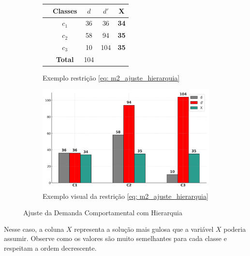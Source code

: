 \begin{figure}[H]
	\centering
	\begin{subfigure}[b]{0.45\linewidth}
		\centering
		\begin{tabular}{lcccc}
			\toprule
			\textbf{} & \textbf{Classes} & \textbf{$d$} & \textbf{$d'$} & \textbf{X} \\
			\midrule
			& $c_1$ & 36  & 36  & \textbf{34} \\
			& $c_2$ & 58  & 94  & \textbf{35} \\
			& $c_3$ & 10  & 104 & \textbf{35} \\
			\midrule
			& \textbf{Total} & 104 & & \\
			\bottomrule
		\end{tabular}
		\caption{Exemplo restrição  \ref{eq: m2_ajuste_hierarquia}}
		\label{tab:exe_ajuste_dem_hierarquia}
	\end{subfigure}\hspace{5mm}
	\begin{subfigure}[b]{0.45\linewidth}
		\centering
		\includegraphics[width=\linewidth]{img/dem_hierar.png}
		\caption{Exemplo visual da restrição \ref{eq: m2_ajuste_hierarquia}}
		\label{fig:dem_classes}
	\end{subfigure}
	\caption{Ajuste da Demanda Comportamental com Hierarquia}
	\label{fig:ajustes_demanda_hierar}
\end{figure}

Nesse caso, a coluna $X$ representa a solução mais gulosa que a variável $X$ poderia assumir. Observe como os valores são muito semelhantes para cada classe e respeitam a ordem decrescente.

